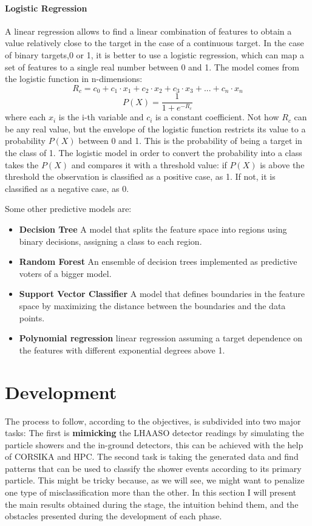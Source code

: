 \documentclass{article}
\begin{document}
\paragraph{Logistic Regression}
A linear regression allows to find a linear combination of features to obtain a value relatively close to the target in the case of a continuous target. In the case of binary targets,0 or 1, it is better to use a logistic regression, which can map a set of features to a single real number between 0 and 1. The model comes from the logistic function in n-dimensions:
\begin{equation}
    R_c = c_0  + c_1\cdot x_1 + c_2\cdot x_2 + c_3\cdot x_3+...+c_n\cdot x_n
\end{equation}
\begin{equation}
 P(X) = \frac{1}{1 + e^{-R_c}}
\end{equation}
where each $x_i$ is the i-th variable and $c_i$ is a  constant coefficient. Not how $R_c$ can be any real value, but the envelope of the logistic function restricts its value to a probability $P(X)$ between 0 and 1. This is the probability of being a target in the class of 1.  The logistic model in order to convert the probability into a class takes the $P(X)$ and compares it with a threshold value: if  $P(X)$ is above the threshold the observation is classified as a positive case, as 1. If not, it is classified as a negative case, as 0.


Some other predictive models are:
\begin{itemize}
    \item \textbf{Decision Tree} A model that splits the feature space into regions using binary decisions, assigning a class to each region.
    \item \textbf{Random Forest} An ensemble of decision trees implemented as predictive voters of a bigger model.
    \item \textbf{Support Vector Classifier} A model that defines boundaries in the feature space by maximizing the distance between the boundaries and the data points.
    \item \textbf{Polynomial regression} linear regression assuming a target dependence on the features with different exponential degrees above 1.
\end{itemize}

\section{Development}
The process to follow, according to the objectives, is subdivided into two major tasks: The first is \textbf{mimicking} the LHAASO detector readings by simulating the particle showers and the in-ground detectors, this can be achieved with the help of CORSIKA and HPC. The second task is taking the generated data and find patterns that can be used to classify the shower events according to its primary particle. This might be tricky because, as we will see, we might want to penalize one type of misclassification more than the other. In this section I will present the main results obtained during the stage, the intuition behind them, and the obstacles presented during the development of each phase.
\end{document}
